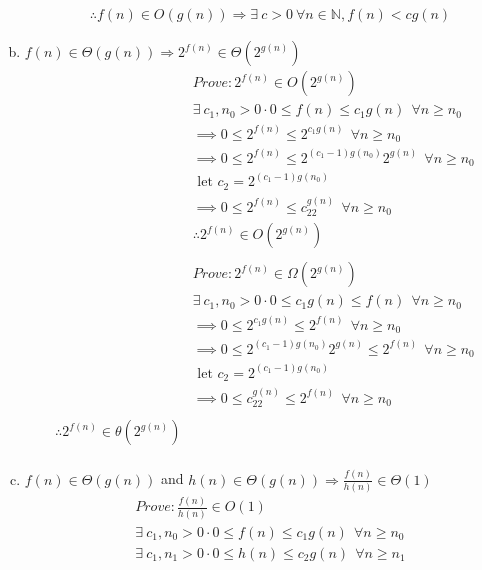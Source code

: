 \documentclass[12pt]{article}
\begin{document}
\begin{enumerate}[(a)]
\begin{align*}
  \\
  &\therefore f(n) \in O(g(n)) \Rightarrow \exists \  c>0 \ \forall n\in \mathbb{N}, f(n) < c g(n)
\end{align*}
\item $f(n)\in \Theta(g(n))\Rightarrow 2^{f(n)} \in \Theta(2^{g(n)})$\\
  \begin{align*}
    &Prove : 2^{f(n)} \in O({2^{g(n)}})\\
    &\exists \  c_1, n_0 > 0 \cdot 0 \leq f(n) \leq c_1g(n) \  \ \forall n \geq n_0\\
    &\implies 0 \leq 2^{f(n)} \leq 2^{c_1g(n)} \  \ \forall n \geq n_0\\
    &\implies 0 \leq 2^{f(n)} \leq 2^{(c_1-1)g(n_0)}2^{g(n)} \  \ \forall n \geq n_0\\
    &\text{ let } c_2 = 2^{(c_1-1)g(n_0)}\\
    &\implies 0 \leq 2^{f(n)} \leq c_22^{g(n)} \  \ \forall n \geq n_0\\
    &\therefore 2^{f(n)} \in O({2^{g(n)}})\\
    \\
    &Prove : 2^{f(n)} \in \Omega({2^{g(n)}})\\
    &\exists \  c_1, n_0 > 0 \cdot 0 \leq c_1g(n) \leq f(n)  \  \ \forall n \geq n_0 \\
    &\implies 0 \leq 2^{c_1g(n)} \leq 2^{f(n)} \  \ \forall n \geq n_0\\
    &\implies 0 \leq 2^{(c_1-1)g(n_0)}2^{g(n)} \leq 2^{f(n)} \  \ \forall n \geq n_0\\
    &\text{ let } c_2 = 2^{(c_1-1)g(n_0)}\\
    &\implies 0 \leq c_22^{g(n)} \leq 2^{f(n)} \  \ \forall n \geq n_0\\
    \\
    \therefore 2^{f(n)} \in \theta({2^{g(n)}})\\
  \end{align*}
\item $f(n)\in \Theta(g(n))$ and 
         $h(n)\in \Theta(g(n)) \Rightarrow \frac{f(n)}{h(n)}\in \Theta(1)$\\
  \begin{align*}
    &Prove: \frac{f(n)}{h(n)} \in O(1)\\
    &\exists \  c_1, n_0 > 0 \cdot 0 \leq f(n) \leq c_1g(n) \  \ \forall n \geq n_0 \\
    &\exists \  c_1, n_1 > 0 \cdot 0 \leq h(n) \leq c_2g(n) \  \ \forall n \geq n_1 \\

\end{align*}
\end{enumerate}
\end{document}
